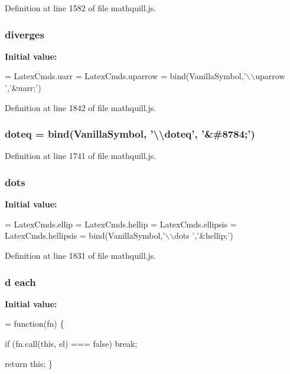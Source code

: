 Definition at line 1582 of file mathquill.\-js.

\subsubsection[{diverges}]{ diverges}\label{mathquill_8js_a7516e4a59104fe706329f12bb09fe2ba}
{\bfseries Initial value\-:}
\begin{DoxyCode}
= LatexCmds.uarr = LatexCmds.uparrow =
  bind(VanillaSymbol,\textcolor{stringliteral}{'\(\backslash\)\(\backslash\)uparrow '},\textcolor{stringliteral}{'&uarr;'})
\end{DoxyCode}


Definition at line 1842 of file mathquill.\-js.

\subsubsection[{doteq}]{ doteq = {\bf bind}({\bf Vanilla\-Symbol}, '\textbackslash{}\textbackslash{}doteq', '\&\#8784;')}\label{mathquill_8js_a1fd66efbb442a67129ae44687ee07cdb}


Definition at line 1741 of file mathquill.\-js.

\subsubsection[{dots}]{ dots}\label{mathquill_8js_a403745d680075ccb4f2b4d1a395bd447}
{\bfseries Initial value\-:}
\begin{DoxyCode}
= LatexCmds.ellip = LatexCmds.hellip =
LatexCmds.ellipsis = LatexCmds.hellipsis =
  bind(VanillaSymbol,\textcolor{stringliteral}{'\(\backslash\)\(\backslash\)dots '},\textcolor{stringliteral}{'&hellip;'})
\end{DoxyCode}


Definition at line 1831 of file mathquill.\-js.

\subsubsection[{each}]{\setlength{\rightskip}{0pt plus 5cm}d each}\label{mathquill_8js_a734e1de789ca45f7044c7c886588cd5b}
{\bfseries Initial value\-:}
\begin{DoxyCode}
= \textcolor{keyword}{function}(fn) \{

    \textcolor{keywordflow}{if} (fn.call(\textcolor{keyword}{this}, el) === \textcolor{keyword}{false}) \textcolor{keywordflow}{break};

  \textcolor{keywordflow}{return} \textcolor{keyword}{this};
\}
\end{DoxyCode}


